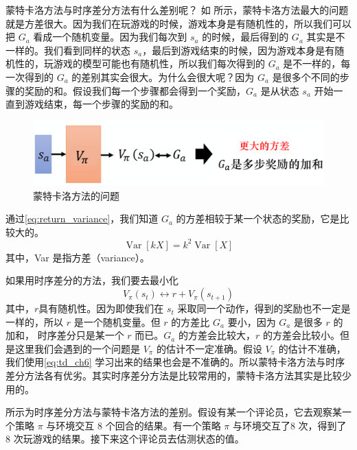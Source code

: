 蒙特卡洛方法与时序差分方法有什么差别呢？
如 所示，蒙特卡洛方法最大的问题就是方差很大。因为我们在玩游戏的时候，游戏本身是有随机性的，所以我们可以把 $G_a$ 看成一个随机变量。因为我们每次到 $s_a$ 的时候，最后得到的 $G_a$ 其实是不一样的。我们看到同样的状态 $s_a$，最后到游戏结束的时候，因为游戏本身是有随机性的，玩游戏的模型可能也有随机性，所以我们每次得到的 $G_a$ 是不一样的，每一次得到的 $G_a$ 的差别其实会很大。为什么会很大呢？因为 $G_a$ 是很多个不同的步骤的奖励的和。假设我们每一个步骤都会得到一个奖励，$G_a$ 是从状态 $s_a$ 开始一直到游戏结束，每一个步骤的奖励的和。


\begin{figure}[hbt]
    \centering
    \includegraphics[width=0.7\linewidth]{res/ch6/6.4}
    \caption{蒙特卡洛方法的问题}
    \label{fig:fig6.4}
\end{figure}

通过\eqref{eq:return_variance}，我们知道 $G_a$ 的方差相较于某一个状态的奖励，它是比较大的。
\begin{equation}
    \label{eq:return_variance}
    \operatorname{Var}[k X]=k^{2} \operatorname{Var}[X]
\end{equation}
其中，Var 是指方差（variance）。 

如果用时序差分的方法，我们要去最小化
\begin{equation}
    \label{eq:td_ch6}
    V_{\pi}\left(s_{t}\right) \longleftrightarrow r+V_{\pi}\left(s_{t+1}\right)
\end{equation}
其中，$r$具有随机性。因为即使我们在 $s_t$ 采取同一个动作，得到的奖励也不一定是一样的，所以 $r$ 是一个随机变量。但 $r$ 的方差比 $G_a$ 要小，因为 $G_a$ 是很多 $r$ 的加和，
时序差分只是某一个 $r$  而已。$G_a$ 的方差会比较大，$r$ 的方差会比较小。但是这里我们会遇到的一个问题是 $V_{\pi}$ 的估计不一定准确。假设 $V_{\pi}$ 的估计不准确，
我们使用\eqref{eq:td_ch6} 学习出来的结果也会是不准确的。所以蒙特卡洛方法与时序差分方法各有优劣。其实时序差分方法是比较常用的，蒙特卡洛方法其实是比较少用的。

 所示为时序差分方法与蒙特卡洛方法的差别。假设有某一个评论员，它去观察某一个策略 $\pi$  与环境交互 8 个回合的结果。有一个策略 $\pi$  与环境交互了8 次，得到了 8 次玩游戏的结果。接下来这个评论员去估测状态的值。

